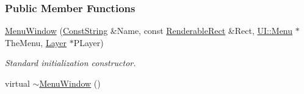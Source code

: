 \subsubsection*{Public Member Functions}
\begin{DoxyCompactItemize}
\item 
\hyperlink{classMezzanine_1_1UI_1_1MenuWindow_af5bf6ab9217583a5622ef32426184316}{MenuWindow} (\hyperlink{namespaceMezzanine_a63cd699ac54b73953f35ec9cfc05e506}{ConstString} \&Name, const \hyperlink{structMezzanine_1_1UI_1_1RenderableRect}{RenderableRect} \&Rect, \hyperlink{classMezzanine_1_1UI_1_1Menu}{UI::Menu} $\ast$TheMenu, \hyperlink{classMezzanine_1_1UI_1_1Layer}{Layer} $\ast$PLayer)
\begin{DoxyCompactList}\small\item\em Standard initialization constructor. \item\end{DoxyCompactList}\item 
\hypertarget{classMezzanine_1_1UI_1_1MenuWindow_a09f5f7ec50a29bce7b3b1b5e0f2c07db}{
virtual \hyperlink{classMezzanine_1_1UI_1_1MenuWindow_a09f5f7ec50a29bce7b3b1b5e0f2c07db}{$\sim$MenuWindow} ()}
\label{classMezzanine_1_1UI_1_1MenuWindow_a09f5f7ec50a29bce7b3b1b5e0f2c07db}


\end{DoxyCompactItemize}
